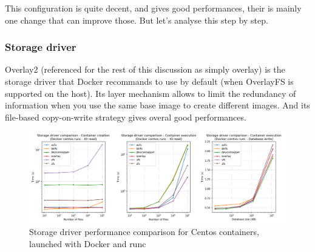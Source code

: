 This configuration is quite decent, and gives good performances, their is mainly one change that can improve those.  But let's analyse this step by step.

\subsubsection{Storage driver}
Overlay2 (referenced for the rest of this discussion as simply overlay) is the storage driver that Docker recommands to use by default (when OverlayFS is supported on the host).  Its layer mechanism allows to limit the redundancy of information when you use the same base image to create different images.  And its file-based copy-on-write strategy gives overal good performances.

\begin{figure}[h!]
  \begin{center}
    \includegraphics[width=\linewidth]{images/question-1-storage-driver.png}
    \caption{Storage driver performance comparison for Centos containers, launched with Docker and runc}
    \label{fig:q1:storage-driver}
  \end{center}
\end{figure}

